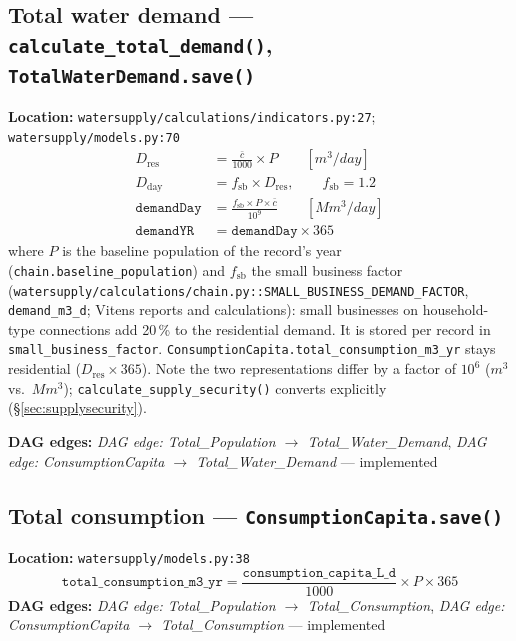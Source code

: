 \documentclass[11pt]{article}
\newcommand{\code}[1]{\texttt{#1}}
\newcommand{\dagedge}[1]{\textit{DAG edge: #1}}
\newcommand{\statusdone}{\textcolor{green!50!black}{implemented}}
\begin{document}
\subsection{Total water demand --- \code{calculate\_total\_demand()}, \code{TotalWaterDemand.save()}}
\textbf{Location:} \code{watersupply/calculations/indicators.py:27}; \code{watersupply/models.py:70}
\begin{align}
  D_{\text{res}} &= \frac{\bar{c}}{1000} \times P \qquad [\si{m^3/day}] \\
  D_{\text{day}} &= f_{\text{sb}} \times D_{\text{res}}, \qquad f_{\text{sb}} = 1.2 \\
  \texttt{demandDay} &= \frac{f_{\text{sb}} \times P \times \bar{c}}{10^9} \qquad [\si{Mm^3/day}] \\
  \texttt{demandYR} &= \texttt{demandDay} \times 365
\end{align}
where $P$ is the baseline population of the record's year (\code{chain.baseline\_population}) and $f_{\text{sb}}$ the small business factor (\code{watersupply/calculations/chain.py::SMALL\_BUSINESS\_DEMAND\_FACTOR}, \code{demand\_m3\_d}; Vitens reports and calculations): small businesses on household-type connections add 20\,\% to the residential demand. It is stored per record in \texttt{small\_business\_factor}. \texttt{ConsumptionCapita.total\_consumption\_m3\_yr} stays residential ($D_{\text{res}} \times 365$). Note the two representations differ by a factor of $10^6$ ($\si{m^3}$ vs.\ $\si{Mm^3}$); \code{calculate\_supply\_security()} converts explicitly (\S\ref{sec:supplysecurity}).

\textbf{DAG edges:} \dagedge{Total\_Population $\rightarrow$ Total\_Water\_Demand}, \dagedge{ConsumptionCapita $\rightarrow$ Total\_Water\_Demand} --- \statusdone{}

\subsection{Total consumption --- \code{ConsumptionCapita.save()}}
\textbf{Location:} \code{watersupply/models.py:38}
\begin{equation}
  \texttt{total\_consumption\_m3\_yr} = \frac{\texttt{consumption\_capita\_L\_d}}{1000} \times P \times 365
\end{equation}
\textbf{DAG edges:} \dagedge{Total\_Population $\rightarrow$ Total\_Consumption}, \dagedge{ConsumptionCapita $\rightarrow$ Total\_Consumption} --- \statusdone{}
\end{document}
